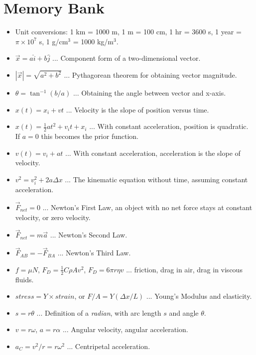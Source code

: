\documentclass[10pt]{article}
\begin{document}
\maketitle

\section{Memory Bank}

\begin{itemize}
\item Unit conversions: 1 km = 1000 m, 1 m = 100 cm, 1 hr = 3600 s, 1 year = $\pi \times 10^7$ s, 1 g/cm$^3$ = 1000 kg/m$^3$.
\item $\vec{x} = a \hat{i} + b\hat{j}$ ... Component form of a two-dimensional vector.
\item $|\vec{x}| = \sqrt{a^2+b^2}$ ... Pythagorean theorem for obtaining vector magnitude.
\item $\theta = \tan^{-1}(b/a)$ ... Obtaining the angle between vector and x-axis.
\item $x(t) = x_i + v t$ ... Velocity is the slope of position versus time.
\item $x(t) = \frac{1}{2} a t^2 + v_i t + x_i$ ... With constant acceleration, position is quadratic.  If $a=0$ this becomes the prior function.
\item $v(t) = v_i + a t$ ... With constant acceleration, acceleration is the slope of velocity.
\item $v^2 = v_i^2 + 2 a \Delta x$ ... The kinematic equation without time, assuming constant acceleration.
\item $\vec{F}_{net} = 0$ ... Newton's First Law, an object with no net force stays at constant velocity, or zero velocity.
\item $\vec{F}_{net} = m\vec{a}$ ... Newton's Second Law.
\item $\vec{F}_{AB} = -\vec{F}_{BA}$ ... Newton's Third Law.
\item $f = \mu N$, $F_D = \frac{1}{2}C\rho A v^2$, $F_D = 6\pi r \eta v$ ... friction, drag in air, drag in viscous fluids.
\item $stress = Y \times strain$, or $F/A = Y (\Delta x / L)$ ... Young's Modulus and elasticity.
\item $s = r \theta$ ... Definition of a \textit{radian}, with arc length $s$ and angle $\theta$.
\item $v = r\omega$, $a = r\alpha$ ... Angular velocity, angular acceleration.
\item $a_C = v^2/r = r\omega^2$ ... Centripetal acceleration.

\end{itemize}
\end{document}
